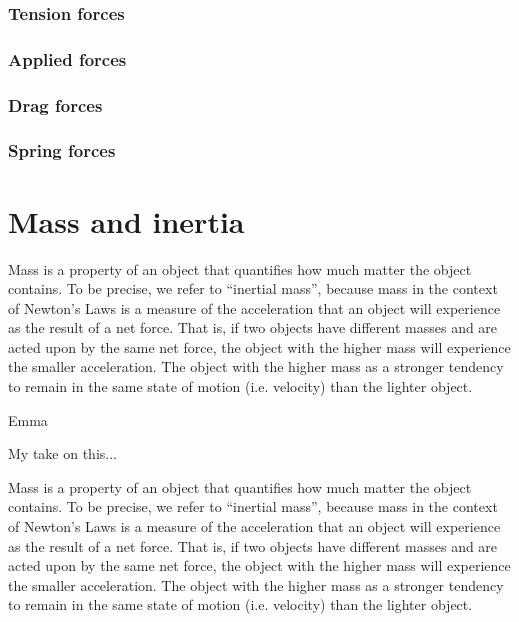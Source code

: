 \subsubsection{Tension forces}

\subsubsection{Applied forces}

\subsubsection{Drag forces}

\subsubsection{Spring forces}



\section{Mass and inertia}
Mass is a property of an object that quantifies how much matter the object contains. To be precise, we refer to ``inertial mass'', because mass in the context of Newton's Laws is a measure of the acceleration that an object will experience as the result of a net force. That is, if two objects have different masses and are acted upon by the same net force, the object with the higher mass will experience the smaller acceleration. The object with the higher mass as a stronger tendency to remain in the same state of motion (i.e. velocity) than the lighter object.

\begin{studentTake}{Emma}

My take on this...

Mass is a property of an object that quantifies how much matter the object contains. To be precise, we refer to ``inertial mass'', because mass in the context of Newton's Laws is a measure of the acceleration that an object will experience as the result of a net force. That is, if two objects have different masses and are acted upon by the same net force, the object with the higher mass will experience the smaller acceleration. The object with the higher mass as a stronger tendency to remain in the same state of motion (i.e. velocity) than the lighter object.


\end{studentTake}

